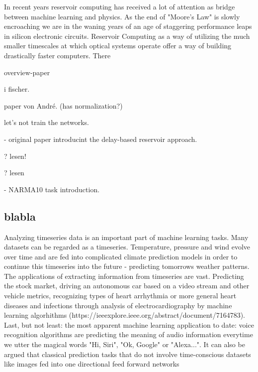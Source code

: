 	In recent years reservoir computing has received a lot of attention as bridge between machine learning and physics. As the end of "Moore's Law" is slowly encroaching we are in the waning years of an age of staggering performance leaps in silicon electronic circuits. Reservoir Computing as a way of utilizing the much smaller timescales at which optical systems operate offer a way of building drastically faster computers. There
	
	\cite{SAN17a} overview-paper

	\cite{LAR12} i fischer.
	
	\cite{ROE18a} paper von André. (has normalization?)
	
	\cite{JAE01} let's not train the networks.
	
	\cite{APP11} - original paper introducint the delay-based reservoir approach.
	
	\cite{ANT19} ? lesen!
	
	\cite{STE20} ? lesen
	
	\cite{ATI00} - NARMA10 task introduction.
	



\subsection{blabla}

Analyzing timeseries data is an important part of machine learning tasks. Many datasets can be regarded as a timeseries. Temperature, pressure and wind evolve over time and are fed into complicated climate prediction models in order to continue this timeseries into the future - predicting tomorrows weather patterns. The applications of extracting information from timeseries are vast. Predicting the stock market, driving an autonomous car based on a video stream and other vehicle metrics, recognizing types of heart arrhythmia or more general heart diseases and infections through analysis of electrocardiography by machine learning algorhithms (https://ieeexplore.ieee.org/abstract/document/7164783). Last, but not least: the most apparent machine learning application to date: voice recognition algorithms are predicting the meaning of audio information everytime we utter the magical words "Hi, Siri", "Ok, Google" or "Alexa...". 
It can also be argued that classical prediction tasks that do not involve time-conscious datasets like images fed into one directional feed forward networks 


